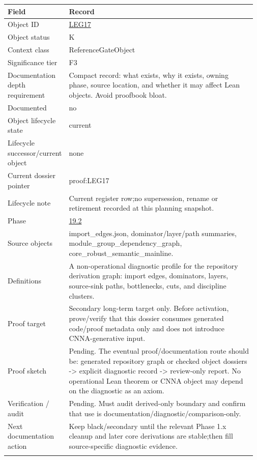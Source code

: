 \begin{longtable}{L{0.16\linewidth} L{0.81\linewidth}}
\hline
\textbf{Field} & \textbf{Record}\\
\hline
Object ID & \hyperlink{object-row-LEG17}{LEG17}\\
\hline\addlinespace[0.20em]
Object status & K\\
\hline\addlinespace[0.20em]
Context class & ReferenceGateObject\\
\hline\addlinespace[0.20em]
Significance tier & F3\\
\hline\addlinespace[0.20em]
Documentation depth requirement & Compact record: what exists, why it exists, owning phase, source location, and whether it may affect Lean objects. Avoid proofbook bloat.\\
\hline\addlinespace[0.20em]
Documented & no\\
\hline\addlinespace[0.20em]
Object lifecycle state & current\\
\hline\addlinespace[0.20em]
Lifecycle successor/\allowbreak{}current object & none\\
\hline\addlinespace[0.20em]
Current dossier pointer & proof:LEG17\\
\hline\addlinespace[0.20em]
Lifecycle note & Current register row;\newline no supersession, rename or retirement recorded at this planning snapshot.\\
\hline\addlinespace[0.20em]
Phase & \hyperlink{phase-row-19-2}{19.2}\\
\hline\addlinespace[0.20em]
Source objects & import\_edges.json, dominator/\allowbreak{}layer/\allowbreak{}path summaries, module\_group\_dependency\_graph, core\_robust\_semantic\_mainline.\\
\hline\addlinespace[0.20em]
Definitions & A non-operational diagnostic profile for the repository derivation graph: import edges, dominators, layers, source-sink paths, bottlenecks, cuts, and discipline clusters.\\
\hline\addlinespace[0.20em]
Proof target & Secondary long-term target only. Before activation, prove/\allowbreak{}verify that this dossier consumes generated code/\allowbreak{}proof metadata only and does not introduce CNNA-generative input.\\
\hline\addlinespace[0.20em]
Proof sketch & Pending. The eventual proof/\allowbreak{}documentation route should be: generated repository graph or checked object dossiers -> explicit diagnostic record -> review-only report. No operational Lean theorem or CNNA object may depend on the diagnostic as an axiom.\\
\hline\addlinespace[0.20em]
Verification /\allowbreak{} audit & Pending. Must audit derived-only boundary and confirm that use is documentation/\allowbreak{}diagnostic/\allowbreak{}comparison-only.\\
\hline\addlinespace[0.20em]
Next documentation action & Keep black/\allowbreak{}secondary until the relevant Phase 1.x cleanup and later core derivations are stable;\newline then fill source-specific diagnostic evidence.\\
\hline\addlinespace[0.20em]
\end{longtable}
